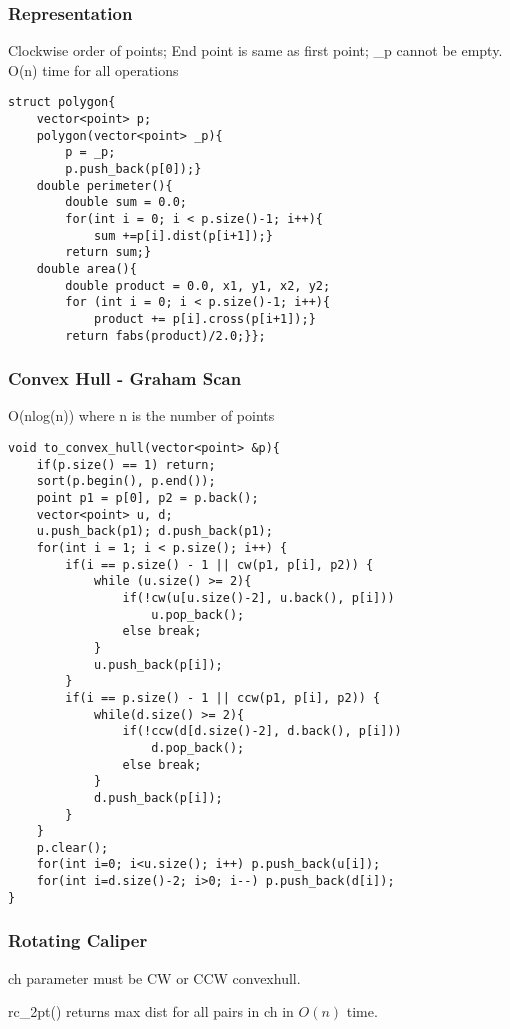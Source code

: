 \documentclass[10pt]{article}{\twocolumn}
\begin{document}
\subsubsection{Representation}
Clockwise order of points; End point is same as first point; \_p cannot be empty. O(n) time for all operations
\begin{lstlisting}
struct polygon{
    vector<point> p;
    polygon(vector<point> _p){
        p = _p;
        p.push_back(p[0]);}
    double perimeter(){
        double sum = 0.0;
        for(int i = 0; i < p.size()-1; i++){
            sum +=p[i].dist(p[i+1]);}
        return sum;}
    double area(){
        double product = 0.0, x1, y1, x2, y2;
        for (int i = 0; i < p.size()-1; i++){
            product += p[i].cross(p[i+1]);}
        return fabs(product)/2.0;}};
\end{lstlisting}

\subsubsection{Convex Hull - Graham Scan}
O(nlog(n)) where n is the number of points
\begin{lstlisting}
void to_convex_hull(vector<point> &p){
    if(p.size() == 1) return;
    sort(p.begin(), p.end());
    point p1 = p[0], p2 = p.back();
    vector<point> u, d;
    u.push_back(p1); d.push_back(p1);
    for(int i = 1; i < p.size(); i++) {
        if(i == p.size() - 1 || cw(p1, p[i], p2)) {
            while (u.size() >= 2){
                if(!cw(u[u.size()-2], u.back(), p[i]))
                    u.pop_back();
                else break;
            }
            u.push_back(p[i]);
        }
        if(i == p.size() - 1 || ccw(p1, p[i], p2)) {
            while(d.size() >= 2){
                if(!ccw(d[d.size()-2], d.back(), p[i]))
                    d.pop_back();
                else break;
            }
            d.push_back(p[i]);
        }
    }
    p.clear();
    for(int i=0; i<u.size(); i++) p.push_back(u[i]);
    for(int i=d.size()-2; i>0; i--) p.push_back(d[i]);
}
\end{lstlisting}

\subsubsection{Rotating Caliper}
ch parameter must be CW or CCW convexhull.

\noindent rc\_2pt() returns max dist for all pairs in ch in $O(n)$ time.
\end{document}
